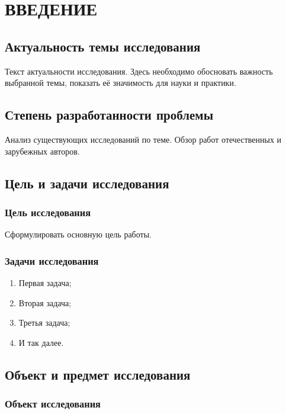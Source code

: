 \chapter{ВВЕДЕНИЕ}

\section{Актуальность темы исследования}

Текст актуальности исследования. Здесь необходимо обосновать важность выбранной темы, показать её значимость для науки и практики.

\section{Степень разработанности проблемы}

Анализ существующих исследований по теме. Обзор работ отечественных и зарубежных авторов.

\section{Цель и задачи исследования}

\subsection{Цель исследования}

Сформулировать основную цель работы.

\subsection{Задачи исследования}

\begin{enumerate}
    \item Первая задача;
    \item Вторая задача;
    \item Третья задача;
    \item И так далее.
\end{enumerate}

\section{Объект и предмет исследования}

\subsection{Объект исследования}


